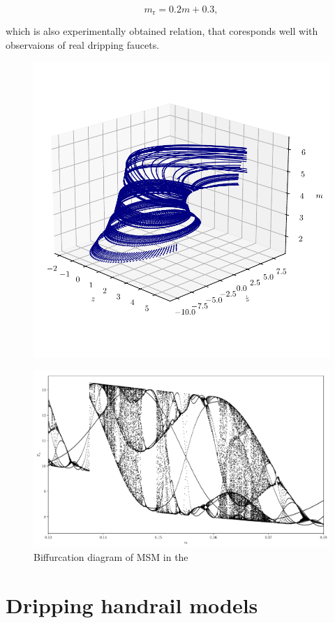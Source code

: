     \begin{equation}
        m_{\mathrm{r}} = 0.2 m + 0.3,
    \end{equation}

    which is also experimentally obtained relation, that coresponds well with observaions of real dripping faucets.

    \begin{figure}[H]
    \begin{center}
        \includegraphics[scale=1.0]{img/plot_msm_state_space.pdf}
    \end{center}
    \caption{}
    \label{fig:}
    \end{figure}

    \begin{figure}
        \includegraphics[width=1.0\columnwidth]{img/plot_msm_bifurcation.pdf}
        \caption{Biffurcation diagram of MSM in the }
    \end{figure}
    



\section{Dripping handrail models}


